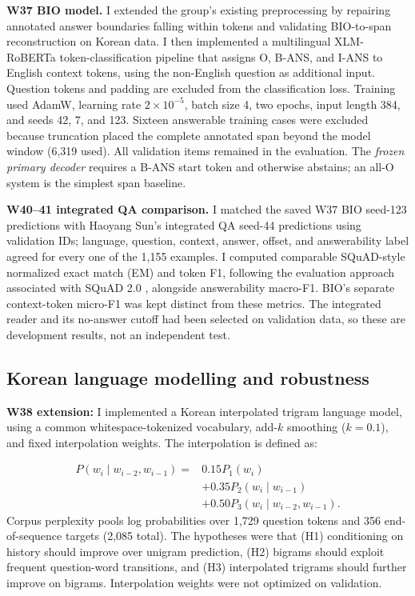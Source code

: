 \documentclass[11pt,a4paper,twocolumn]{article}
\begin{document}
\textbf{W37 BIO model.} I extended the group's existing preprocessing by repairing annotated answer boundaries falling within tokens and validating BIO-to-span reconstruction on Korean data. I then implemented a multilingual XLM-RoBERTa token-classification pipeline \citep{conneau2020xlmr} that assigns O, B-ANS, and I-ANS to English context tokens, using the non-English question as additional input. Question tokens and padding are excluded from the classification loss. Training used AdamW, learning rate $2\times10^{-5}$, batch size 4, two epochs, input length 384, and seeds 42, 7, and 123. Sixteen answerable training cases were excluded because truncation placed the complete annotated span beyond the model window (6,319 used). All validation items remained in the evaluation. The \emph{frozen primary decoder} requires a B-ANS start token and otherwise abstains; an all-O system is the simplest span baseline.

\textbf{W40--41 integrated QA comparison.} I matched the saved W37 BIO seed-123 predictions with Haoyang Sun's integrated QA seed-44 predictions using validation IDs; language, question, context, answer, offset, and answerability label agreed for every one of the 1,155 examples. 
I computed comparable SQuAD-style normalized
exact match (EM) and token F1, following
the evaluation approach associated with
SQuAD 2.0 \citep{rajpurkar2018squad2},
alongside answerability macro-F1.
BIO's separate context-token micro-F1
was kept distinct from these metrics. The integrated reader and its no-answer cutoff had been selected on validation data, so these are development results, not an independent test.

\subsection{Korean language modelling and robustness}

\textbf{W38 extension:} I implemented a Korean
interpolated trigram language model, using a
common whitespace-tokenized vocabulary,
add-$k$ smoothing ($k=0.1$), and fixed
interpolation weights. The interpolation is defined as:

\begin{equation}\label{eq:mix}
\begin{split}
P(w_i\mid w_{i-2},w_{i-1})={}&0.15P_1(w_i)\\
 &+0.35P_2(w_i\mid w_{i-1})\\
 &+0.50P_3(w_i\mid w_{i-2},w_{i-1}).
\end{split}
\end{equation}
Corpus perplexity pools log probabilities over 1,729 question tokens and 356 end-of-sequence targets (2,085 total). The hypotheses were that (H1) conditioning on history should improve over unigram prediction, (H2) bigrams should exploit frequent question-word transitions, and (H3) interpolated trigrams should further improve on bigrams. Interpolation weights were not optimized on validation.
\end{document}
